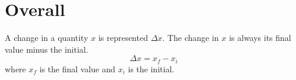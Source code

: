 \section{Overall}
A change in a quantity $x$ is represented $\Delta x$. The change in $x$ is always its final value
minus the initial.
$$ \Delta x = x_f - x_i $$
where $x_f$ is the final value and $x_i$ is the initial.

